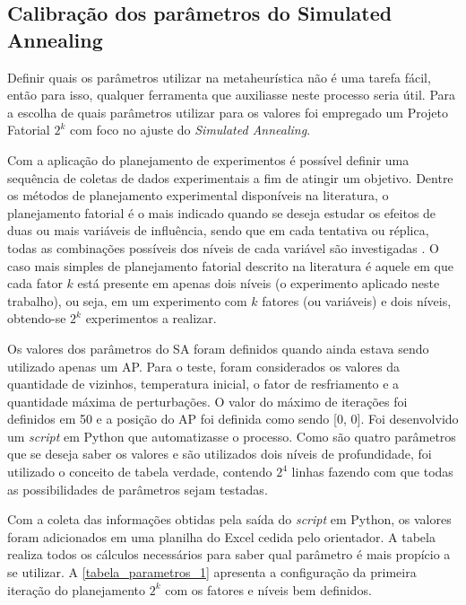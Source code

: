 \documentclass[
	12pt,				%
	twoside,			%
	a4paper,			%
	english,			%
	french,				%
	spanish,			%
	brazil				%
	]{abntex2}
\begin{document}
\subsection{Calibração dos parâmetros do Simulated
Annealing}\label{calibrauxe7uxe3o-dos-paruxe2metros-do-simulated-annealing}

Definir quais os parâmetros utilizar na metaheurística não é uma tarefa
fácil, então para isso, qualquer ferramenta que auxiliasse neste
processo seria útil. Para a escolha de quais parâmetros utilizar para os
valores foi empregado um Projeto Fatorial \(2^{k}\) com foco no ajuste
do \emph{Simulated Annealing}.

Com a aplicação do planejamento de experimentos é possível definir uma
sequência de coletas de dados experimentais a fim de atingir um
objetivo. Dentre os métodos de planejamento experimental disponíveis na
literatura, o planejamento fatorial é o mais indicado quando se deseja
estudar os efeitos de duas ou mais variáveis de influência, sendo que em
cada tentativa ou réplica, todas as combinações possíveis dos níveis de
cada variável são investigadas \cite{NETO}. O caso mais simples de
planejamento fatorial descrito na literatura é aquele em que cada fator
\(k\) está presente em apenas dois níveis (o experimento aplicado neste
trabalho), ou seja, em um experimento com \(k\) fatores (ou variáveis) e
dois níveis, obtendo-se \(2^{k}\) experimentos a realizar.

Os valores dos parâmetros do SA foram definidos quando ainda estava
sendo utilizado apenas um AP. Para o teste, foram considerados os
valores da quantidade de vizinhos, temperatura inicial, o fator de
resfriamento e a quantidade máxima de perturbações. O valor do máximo de
iterações foi definidos em 50 e a posição do AP foi definida como sendo
{[}0, 0{]}. Foi desenvolvido um \emph{script} em Python que
automatizasse o processo. Como são quatro parâmetros que se deseja saber
os valores e são utilizados dois níveis de profundidade, foi utilizado o
conceito de tabela verdade, contendo \(2^{4}\) linhas fazendo com que
todas as possibilidades de parâmetros sejam testadas.

Com a coleta das informações obtidas pela saída do \emph{script} em
Python, os valores foram adicionados em uma planilha do Excel cedida
pelo orientador. A tabela realiza todos os cálculos necessários para
saber qual parâmetro é mais propício a se utilizar. A
\autoref{tabela_parametros_1} apresenta a configuração da primeira
iteração do planejamento \(2^{k}\) com os fatores e níveis bem
definidos.
\end{document}
